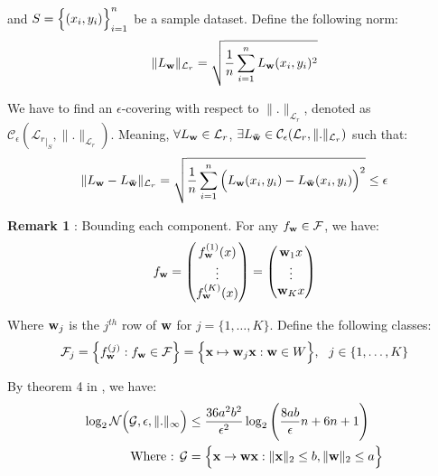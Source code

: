 \noindent and $S=\Big\{ (x_i, y_i) \Big\}_{i=1}^n$ be a sample dataset. Define the following norm:
\begin{align*}
    \|L_{\bf w}\|_{\mathcal{L}_r} = \sqrt{
        \frac{1}{n} \sum_{i=1}^n L_{\bf w}(x_i, y_i)^2
    }
\end{align*}

\noindent We have to find an $\epsilon$-covering with respect to $\|.\|_{\mathcal{L}_r}$, denoted as $\mathcal{C}_\epsilon({\mathcal{L}_r}_{|_S}, \|.\|_{\mathcal{L}_r})$. Meaning, $\forall L_{\bf w}\in\mathcal{L}_r$, $\exists L_{\bf \bar w} \in \mathcal{C}_\epsilon(\mathcal{L}_r, \|.\|_{\mathcal{L}_r})$ such that:
\begin{align*}
    \|L_{\bf w} - L_{\bf \bar w}\|_{\mathcal{L}_r} = \sqrt{
        \frac{1}{n} \sum_{i=1}^n \Big( 
            L_{\bf w}(x_i, y_i) - L_{\bf \bar w}(x_i, y_i)
         \Big)^2
    } \le \epsilon
\end{align*}

\noindent\textbf{Remark 1} : Bounding each component.\newline
\noindent For any $f_{\bf w}\in\mathcal{F}$, we have:
\begin{align*}
    f_{\bf w} = \begin{pmatrix}
        f_{\bf w}^{(1)}(x) \\
        \vdots \\
        f_{\bf w}^{(K)}(x)
    \end{pmatrix}
    = 
    \begin{pmatrix}
        {\bf w}_{1}x \\
        \vdots \\
        {\bf w}_{K}x
    \end{pmatrix}
\end{align*}

\noindent Where ${\bf w}_j$ is the $j^{th}$ row of ${\bf w}$ for $j=\{1, \dots, K\}$. Define the following classes:
\begin{align*}
    \F_j = \bigCurl{f_\vecbf{w}^{(j)} : f_\vecbf{w} \in \F} = \bigCurl{\vecbf{x} \mapsto \vecbf{w}_j\vecbf{x} : \vecbf{w} \in W}, \ \ j \in \{1, \dots, K\}
\end{align*}

\noindent By theorem 4 in \cite{article:tong_zhang}, we have:
\begin{align*}
    \log_2\mathcal{N}\Big( 
        \mathcal{G}, \epsilon, \|.\|_\infty
     \Big) &\le \frac{36a^2b^2}{\epsilon^2}\log_2\Bigg( 
        \frac{8ab}{\epsilon}n + 6n + 1
     \Bigg) \\
    \text{Where : } \mathcal{G} &=  \Big\{ 
        {\bf x} \to {\bf wx} : \|{\bf x}\|_2 \le b, \|{\bf w}\|_2 \le a
     \Big\}
\end{align*}

